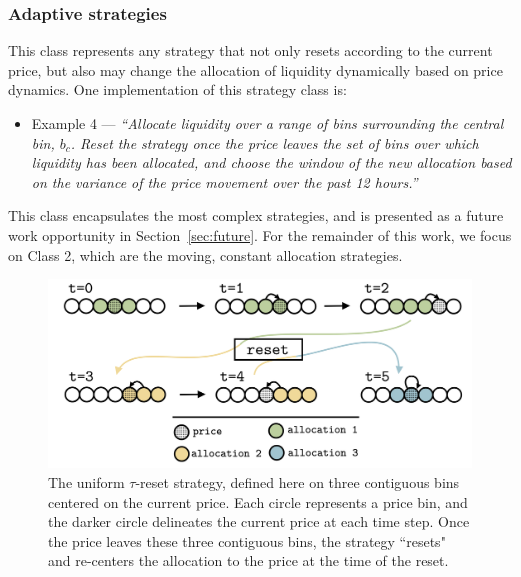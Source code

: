 \documentclass[sigconf, usenames, dvipsnames]{acmart}
\begin{document}

\subsubsection{Adaptive strategies}
This class represents any strategy that not only resets according to the current price, but also may change the allocation of liquidity dynamically based on price dynamics. One implementation of this strategy class is: 
\begin{itemize}
    \item[] Example 4 --- \textit{``Allocate liquidity over a range of bins surrounding the central bin, $b_c$. Reset the strategy once the price leaves the set of bins over which liquidity has been allocated, and choose the window of the new allocation based on the variance of the price movement over the past 12 hours.''}
\end{itemize}
This class encapsulates the most complex strategies, and is presented as a future work opportunity in Section~\ref{sec:future}. For the remainder of this work, we focus on Class 2, which are the moving, constant allocation strategies.

\fi

\begin{figure}
    \centering
    \includegraphics[width=\linewidth]{img/reset_strat.png}
    \caption{The uniform $\tau$-reset strategy, defined here on three contiguous bins centered on the current price.  Each circle represents a price bin, and the darker circle delineates the current price at each time step.
    Once the price leaves these three contiguous bins,  the strategy ``resets" and re-centers the allocation to the price at the time of the reset.
    \label{fig:reset_strat}}
\end{figure}



\end{document}
